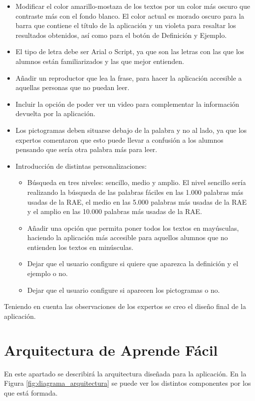 \begin{itemize} 
	\item Modificar el color amarillo-mostaza de los textos por un color más oscuro que contraste más con el fondo blanco. El color actual es morado oscuro para la barra que contiene el título de la aplicación y un violeta para resaltar los resultados obtenidos, así como para el botón de Definición y Ejemplo.
	\item El tipo de letra debe ser Arial o Script, ya que son las letras con las que los alumnos están familiarizados y las que mejor entienden.
	\item Añadir un reproductor que lea la frase, para hacer la aplicación accesible a aquellas personas que no puedan leer.
	\item Incluir la opción de poder ver un video para complementar la información devuelta por la aplicación.
	\item Los pictogramas deben situarse debajo de la palabra y no al lado, ya que los expertos comentaron que esto puede llevar a confusión a los alumnos pensando que sería otra palabra más para leer. 
	\item Introducción de distintas personalizaciones:
	\begin{itemize}
		\item Búsqueda en tres niveles: sencillo, medio y amplio. El nivel sencillo sería realizando la búsqueda de las palabras fáciles en las 1.000 palabras más usadas de la RAE, el medio en las 5.000 palabras más usadas de la RAE y el amplio en las 10.000 palabras más usadas de la RAE. 
		\item Añadir una opción que permita poner todos los textos en mayúsculas, haciendo la aplicación más accesible para aquellos alumnos que no entienden los textos en minúsculas.
		\item Dejar que el usuario configure si quiere que aparezca la definición y el ejemplo o no.
		\item Dejar que el usuario configure  si aparecen los pictogramas o no.
	\end{itemize}
\end{itemize}

Teniendo en cuenta las observaciones de los expertos se creo el diseño final de la aplicación.



\section{Arquitectura de Aprende Fácil}
En este apartado se describirá la arquitectura diseñada para la aplicación. En la Figura \ref{fig:diagrama_arquitectura} se puede ver los distintos componentes por los que está formada.


